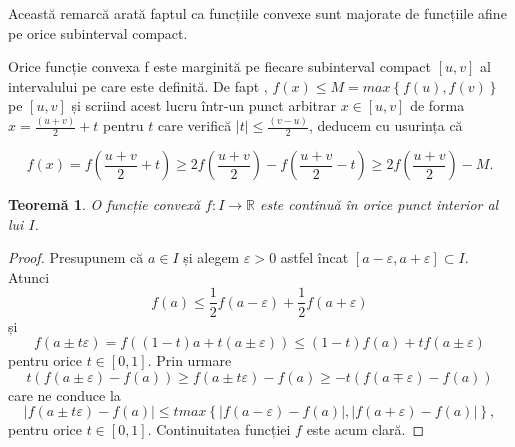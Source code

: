 \documentclass[a4paper,12pt,oneside]{report}
\newtheorem{theorem}{Teorem\u a}
\begin{document}
Această remarcă arată faptul ca funcțiile convexe sunt majorate de funcțiile afine pe orice subinterval compact.

Orice funcție convexa f este marginită pe fiecare subinterval compact \(\left [ u , v \right ]\) al intervalului pe care este definită. De fapt , \(f\left ( x \right ) \leq  M = max \left \{ f\left ( u \right ), f\left ( v \right ) \right \}\)  pe \(\left [ u , v \right ]\)  și scriind acest lucru într-un punct arbitrar \(x\in  \left [ u , v  \right ]\)  de forma  \(x= \frac{\left ( u + v \right )}{2} + t\) pentru  \(t\) care verifică \(\left | t \right |\leq \frac{\left ( v - u \right )}{2}\), deducem cu usurința că

\begin{displaymath}
  f\left ( x \right )=  f\left ( \frac{u+v}{2} + t\right )\geq 2 f\left ( \frac{u + v}{2} \right )- f\left ( \frac{u + v}{2} - t\right )\geq 2f\left ( \frac{u+v}{2} \right ) - M.
\end{displaymath}

\begin{theorem}
O funcție convexă \(f: I \rightarrow \mathbb{R}\) este continuă în orice punct interior al lui \(I\). 	
\end{theorem}
\begin{proof}
	Presupunem că \(a\in I\) și alegem \(\varepsilon > 0\) astfel încat \(\left [ a - \varepsilon , a + \varepsilon  \right ] \subset I\).
 Atunci
\begin{displaymath}
  f\left ( a \right )\leq \frac{1}{2} f\left ( a - \varepsilon  \right ) + \frac{1}{2}f \left ( a + \varepsilon  \right )
\end{displaymath}
și
\begin{displaymath}
  f\left ( a \pm t\varepsilon  \right )= f\left ( \left ( 1 - t \right ) a + t\left ( a \pm \varepsilon  \right )\right )\leq \left ( 1 - t \right )f\left ( a \right ) + tf\left ( a\pm \varepsilon  \right )
\end{displaymath}
pentru orice \(t\in \left [ 0 , 1 \right ]\). Prin urmare
\begin{displaymath}
  t\left ( f\left ( a\pm \varepsilon  \right ) - f\left ( a \right ) \right )\geq f\left ( a\pm t\varepsilon  \right )- f\left ( a \right )\geq -t\left ( f\left ( a\mp \varepsilon  \right ) - f\left ( a \right )\right )
\end{displaymath}
care ne conduce la
\begin{displaymath}
\left | f\left ( a\pm t\varepsilon  \right )- f\left ( a \right ) \right |\leq t max \left \{ \left | f\left ( a-\varepsilon  \right )- f\left ( a \right ) \right |, \left | f\left ( a+\varepsilon  \right ) - f\left ( a \right )\right | \right \},
\end{displaymath}
 pentru orice \(t\in \left [ 0 , 1 \right ]\). Continuitatea funcției \(f\) este acum clară.
 \end{proof}
\end{document}
